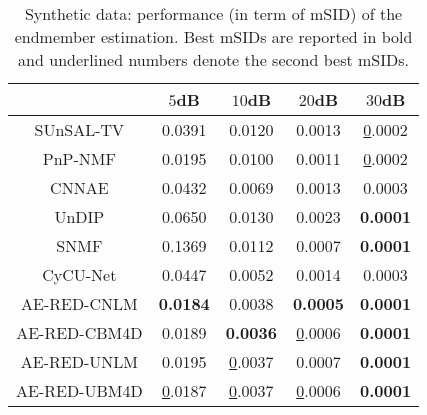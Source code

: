 \documentclass[journal,a4paper]{IEEEtran}
\begin{document}
\begin{table}[h]
\centering
\renewcommand\arraystretch{1.5}
\caption{Synthetic data: performance (in term of mSID) of the endmember estimation. Best mSIDs are reported in bold and underlined numbers denote the second best mSIDs.}\label{Tab_syn_mSID_results}
\begin{tabular}{c|c|c|c|c}
\hline\hline
            & $5$dB            & $10$dB           & $20$dB           & $30$dB           \\ \hline
SUnSAL-TV   & 0.0391          & 0.0120          & 0.0013          & {\ul 0.0002}    \\ \hline
PnP-NMF     & 0.0195          & 0.0100          & 0.0011          & {\ul 0.0002}    \\ \hline
CNNAE       & 0.0432          & 0.0069          & 0.0013          & 0.0003          \\ \hline
UnDIP       & 0.0650          & 0.0130          & 0.0023          & \textbf{0.0001} \\ \hline
SNMF        & 0.1369          & 0.0112          & 0.0007          & \textbf{0.0001} \\ \hline
CyCU-Net    & 0.0447          & 0.0052          & 0.0014          & 0.0003          \\ \hline
AE-RED-CNLM  & \textbf{0.0184} & 0.0038          & \textbf{0.0005} & \textbf{0.0001} \\ \hline
AE-RED-CBM4D & 0.0189          & \textbf{0.0036} & {\ul 0.0006}    & \textbf{0.0001} \\ \hline
AE-RED-UNLM  & 0.0195          & {\ul 0.0037}    & 0.0007          & \textbf{0.0001} \\ \hline
AE-RED-UBM4D & {\ul 0.0187}    & {\ul 0.0037}    & {\ul 0.0006}    & \textbf{0.0001} \\ \hline\hline
\end{tabular}
\end{table}
\end{document}
